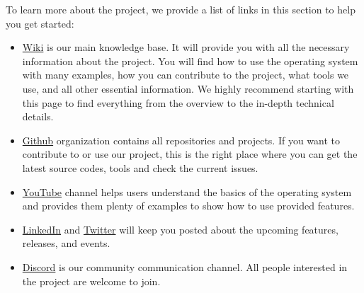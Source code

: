 To learn more about the project, we provide a list of links in this section to help you get started:
\begin{itemize}
\vspace{-0.2cm}\item \href{https://cosmos-creators.github.io}{Wiki} is our main knowledge base. It will provide you with all the necessary information about the project. You will find how to use the operating system with many examples, how you can contribute to the project, what tools we use, and all other essential information. We highly recommend starting with this page to find everything from the overview to the in-depth technical details.
\vspace{-0.2cm}\item \href{https://github.com/CosmOS-Creators}{Github} organization contains all repositories and projects. If you want to contribute to or use our project, this is the right place where you can get the latest source codes, tools and check the current issues.
\vspace{-0.2cm}\item \href{https://www.youtube.com/channel/UCWSxT8kLvbVGm-9HlEyiRUg}{YouTube} channel helps users understand the basics of the operating system and provides them plenty of examples to show how to use provided features. 
\vspace{-0.2cm}\item \href{https://www.linkedin.com/company/cosmoscreators}{LinkedIn} and \href{https://twitter.com/cosmos_creators}{Twitter} will keep you posted about the upcoming features, releases, and events.
\vspace{-0.2cm}\item \href{https://discord.gg/XTabzYYVxS}{Discord} is our community communication channel. All people interested in the project are welcome to join.
\end{itemize}
